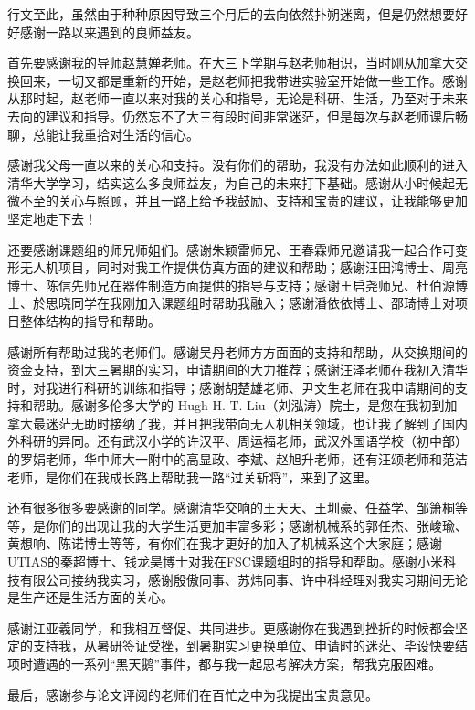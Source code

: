 
\begin{acknowledgements}
  行文至此，虽然由于种种原因导致三个月后的去向依然扑朔迷离，但是仍然想要好好感谢一路以来遇到的良师益友。
  
  首先要感谢我的导师赵慧婵老师。在大三下学期与赵老师相识，当时刚从加拿大交换回来，一切又都是重新的开始，是赵老师把我带进实验室开始做一些工作。感谢从那时起，赵老师一直以来对我的关心和指导，无论是科研、生活，乃至对于未来去向的建议和指导。仍然忘不了大三有段时间非常迷茫，但是每次与赵老师课后畅聊，总能让我重拾对生活的信心。

  感谢我父母一直以来的关心和支持。没有你们的帮助，我没有办法如此顺利的进入清华大学学习，结实这么多良师益友，为自己的未来打下基础。感谢从小时候起无微不至的关心与照顾，并且一路上给予我鼓励、支持和宝贵的建议，让我能够更加坚定地走下去！

  还要感谢课题组的师兄师姐们。感谢朱颖雷师兄、王春霖师兄邀请我一起合作可变形无人机项目，同时对我工作提供仿真方面的建议和帮助；感谢汪田鸿博士、周亮博士、陈信先师兄在器件制造方面提供的指导与支持；感谢王启尧师兄、杜伯源博士、於思晓同学在我刚加入课题组时帮助我融入；感谢潘依依博士、邵琦博士对项目整体结构的指导和帮助。

  感谢所有帮助过我的老师们。感谢吴丹老师方方面面的支持和帮助，从交换期间的资金支持，到大三暑期的实习，申请期间的大力推荐；感谢汪泽老师在我初入清华时，对我进行科研的训练和指导；感谢胡楚雄老师、尹文生老师在我申请期间的支持和帮助。感谢多伦多大学的 Hugh H. T. Liu（刘泓涛）院士，是您在我初到加拿大最迷茫无助时接纳了我，并且把我带向无人机相关领域，也让我了解到了国内外科研的异同。还有武汉小学的许汉平、周运福老师，武汉外国语学校（初中部）的罗娟老师，华中师大一附中的高显政、李斌、赵旭升老师，还有汪颂老师和范洁老师，是你们在我成长路上帮助我一路“过关斩将”，来到了这里。

  还有很多很多要感谢的同学。感谢清华交响的王天天、王圳豪、任益学、邹箫桐等等，是你们的出现让我的大学生活更加丰富多彩；感谢机械系的郭任杰、张峻瑜、黄想响、陈诺博士等等，有你们在我才更好的加入了机械系这个大家庭；感谢UTIAS的秦超博士、钱龙昊博士对我在FSC课题组时的指导和帮助。感谢小米科技有限公司接纳我实习，感谢殷傲同事、苏炜同事、许中科经理对我实习期间无论是生产还是生活方面的关心。

  感谢江亚羲同学，和我相互督促、共同进步。更感谢你在我遇到挫折的时候都会坚定的支持我，从暑研签证受挫，到暑期实习更换单位、申请时的迷茫、毕设快要结项时遭遇的一系列“黑天鹅”事件，都与我一起思考解决方案，帮我克服困难。

  最后，感谢参与论文评阅的老师们在百忙之中为我提出宝贵意见。
\end{acknowledgements}
